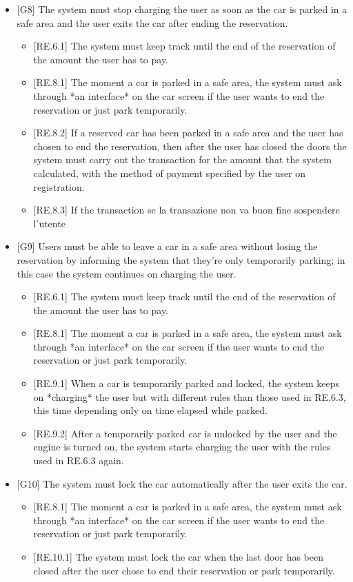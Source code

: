 \documentclass[english]{article}
\begin{document}
\begin{itemize}
\item{[G8] The system must stop charging the user as soon as the car is parked in a safe area and the user exits the car after ending the reservation.
\begin{itemize}
	\item{[RE.6.1] The system must keep track until the end of the reservation of the amount the user has to pay.}
	\item{[RE.8.1] The moment a car is parked in a safe area, the system must ask through *an interface* on the car screen if the user wants to end the reservation or just park temporarily.}
	\item{[RE.8.2] If a reserved car has been parked in a safe area and the user has chosen to end the reservation, then after the user has closed the doors the system must carry out the transaction for the amount that the system calculated, with the method of payment specified by the user on registration.}
	\item{[RE.8.3] If the transaction} se la transazione non va buon fine sospendere l'utente
\end{itemize}
}

\item{[G9] Users must be able to leave a car in a safe area without losing the reservation by informing the system that they’re only temporarily parking; in this case the system continues on charging the user.
\begin{itemize}
	\item{[RE.6.1] The system must keep track until the end of the reservation of the amount the user has to pay.}
	\item{[RE.8.1] The moment a car is parked in a safe area, the system must ask through *an interface* on the car screen if the user wants to end the reservation or just park temporarily.}
	\item{[RE.9.1] When a car is temporarily parked and locked, the system keeps on *charging* the user but with different rules than those used in RE.6.3, this time depending only on time elapsed while parked.}
	\item{[RE.9.2] After a temporarily parked car is unlocked by the user and the engine is turned on, the system starts charging the user with the rules used in RE.6.3 again.}
\end{itemize}
}

\item{[G10] The system must lock the car automatically after the user exits the car.
\begin{itemize}
	\item{[RE.8.1] The moment a car is parked in a safe area, the system must ask through *an interface* on the car screen if the user wants to end the reservation or just park temporarily.}
	\item{[RE.10.1] The system must lock the car when the last door has been closed after the user chose to end their reservation or park temporarily.}
\end{itemize}
}


\end{itemize}
\end{document}
